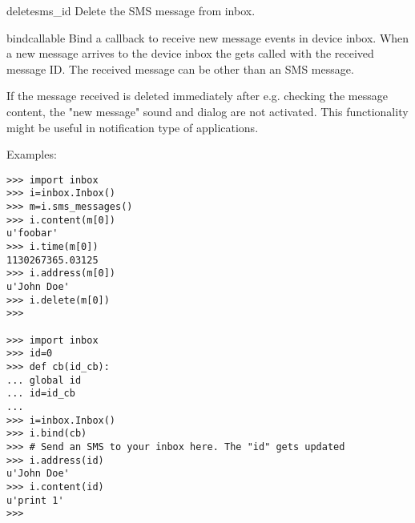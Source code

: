 \begin{methoddesc}[Inbox]{delete}{sms_id}
Delete the SMS message from inbox.
\end{methoddesc}

\begin{methoddesc}[Inbox]{bind}{callable}
Bind a callback to receive new message events in device inbox. When a new 
message arrives to the device inbox the  gets 
called with the received message ID. The received message can be other than 
an SMS message.

If the message received is deleted immediately after e.g. checking the message 
content, the "new message" sound and dialog are not activated. This 
functionality might be useful in notification type of applications. 
\end{methoddesc}

Examples:
\begin{verbatim}
>>> import inbox
>>> i=inbox.Inbox()
>>> m=i.sms_messages()
>>> i.content(m[0])
u'foobar'
>>> i.time(m[0])
1130267365.03125
>>> i.address(m[0])
u'John Doe'
>>> i.delete(m[0])
>>>

>>> import inbox 
>>> id=0 
>>> def cb(id_cb): 
... global id 
... id=id_cb
... 
>>> i=inbox.Inbox()
>>> i.bind(cb)
>>> # Send an SMS to your inbox here. The "id" gets updated
>>> i.address(id)
u'John Doe'
>>> i.content(id)
u'print 1'
>>>
\end{verbatim}

